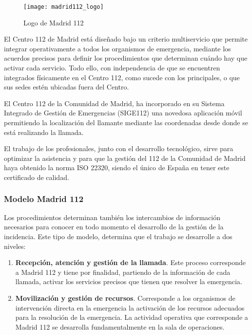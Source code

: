\begin{figure}[htp!]
  \centering
  \texttt{[image: madrid112\_logo]}
  \caption{Logo de Madrid 112}
  \label{fig:madrid112_logo}
\end{figure}

El Centro 112 de Madrid está diseñado bajo un criterio multiservicio que permite integrar operativamente a todos los organismos de emergencia, mediante los acuerdos precisos para definir los procedimientos que determinan cuándo hay que activar cada servicio. Todo ello, con independencia de que se encuentren integrados físicamente en el Centro 112, como sucede con los principales, o que sus sedes estén ubicadas fuera del Centro.

El Centro 112 de la Comunidad de Madrid, ha incorporado en su Sistema Integrado de Gestión de Emergencias (SIGE112) una novedosa aplicación móvil permitiendo la localización del llamante mediante las coordenadas desde donde se está realizando la llamada.

El trabajo de los profesionales, junto con el desarrollo tecnológico, sirve para optimizar la asistencia y para que la gestión del 112 de la Comunidad de Madrid haya obtenido la norma ISO 22320, siendo el único de España en tener este certificado de calidad.

\subsubsection{Modelo Madrid 112}

Los procedimientos determinan también los intercambios de información necesarios para conocer en todo momento el desarrollo de la gestión de la incidencia. Este tipo de modelo, determina que el trabajo se desarrolle a dos niveles:

\begin{enumerate}
  \item \textbf{Recepción, atención y gestión de la llamada}. Este proceso corresponde a Madrid 112 y tiene por finalidad, partiendo de la información de cada llamada, activar los servicios precisos que tienen que resolver la emergencia.
  \item \textbf{Movilización y gestión de recursos}. Corresponde a los organismos de intervención directa en la emergencia la activación de los recursos adecuados para la resolución de la emergencia. La actividad operativa que corresponde a Madrid 112 se desarrolla fundamentalmente en la sala de operaciones.
\end{enumerate}

